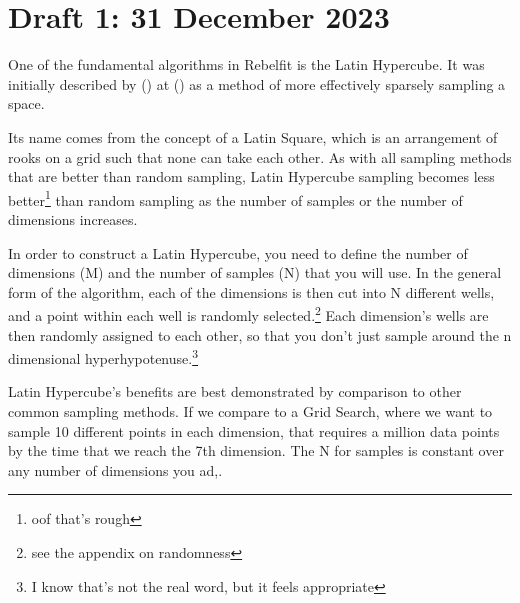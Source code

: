 \documentclass[12pt]{article}[titlepage]
\renewcommand{\,}{\textsuperscript{,}}
\begin{document}
\section{Draft 1: 31 December 2023}
One of the fundamental algorithms in Rebelfit is the Latin Hypercube.
It was initially described by () at () as a method of more effectively sparsely sampling a space.

Its name comes from the concept of a Latin Square, which is an arrangement of rooks on a grid such that none can take each other.
As with all sampling methods that are better than random sampling, Latin Hypercube sampling becomes less better\footnote{oof that's rough} than random sampling as the number of samples or the number of dimensions increases.

In order to construct a Latin Hypercube, you need to define the number of dimensions (M) and the number of samples (N) that you will use.
In the general form of the algorithm, each of the dimensions is then cut into N different wells, and a point within each well is randomly selected.\footnote{see the appendix on randomness}
Each dimension's wells are then randomly assigned to each other, so that you don't just sample around the n dimensional hyperhypotenuse.\footnote{I know that's not the real word, but it feels appropriate}

Latin Hypercube's benefits are best demonstrated by comparison to other common sampling methods.
If we compare to a Grid Search, where we want to sample 10 different points in each dimension, that requires a million data points by the time that we reach the 7th dimension.
The N for samples is constant over any number of dimensions you ad,.
\end{document}
